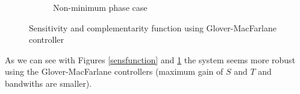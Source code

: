 \begin{figure}[h!t]
\begin{subfigure}[b]{0.45\columnwidth}
                \caption{Non-minimum phase case}
        \end{subfigure}
        \caption{Sensitivity and complementarity function using Glover-MacFarlane controller}
        \label{sensfunctionglover}
\end{figure}

As we can see with Figures \ref{sensfunction} and \ref{sensfunctionglover} the system seems more robust using the Glover-MacFarlane controllers (maximum gain of $S$ and $T$ and bandwiths are smaller).
